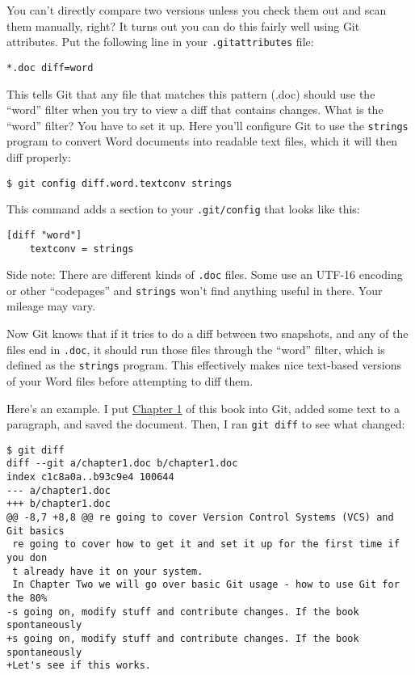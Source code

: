 \documentclass[a4paper]{book}
\newcommand{\prechap}{Chapter }
\newcommand{\postchap}{}
\newcommand{\chapref}[1]{\hyperref[chap:#1]{\prechap #1\postchap}}
\begin{document}
You can't directly compare two versions unless you check them out and scan them manually, right? It turns out you can do this fairly well using Git attributes. Put the following line in your \texttt{.gitattributes} file:

\begin{shaded}\begin{verbatim}
*.doc diff=word
\end{verbatim}\end{shaded}

This tells Git that any file that matches this pattern (.doc) should use the “word” filter when you try to view a diff that contains changes. What is the “word” filter? You have to set it up. Here you'll configure Git to use the \texttt{strings} program to convert Word documents into readable text files, which it will then diff properly:

\begin{shaded}\begin{verbatim}
$ git config diff.word.textconv strings
\end{verbatim}\end{shaded}

This command adds a section to your \texttt{.git/config} that looks like this:

\begin{shaded}\begin{verbatim}
[diff "word"]
	textconv = strings
\end{verbatim}\end{shaded}

Side note: There are different kinds of \texttt{.doc} files. Some use an UTF-16 encoding or other “codepages” and \texttt{strings} won't find anything useful in there. Your mileage may vary.

Now Git knows that if it tries to do a diff between two snapshots, and any of the files end in \texttt{.doc}, it should run those files through the “word” filter, which is defined as the \texttt{strings} program. This effectively makes nice text-based versions of your Word files before attempting to diff them.

Here's an example. I put \chapref{1} of this book into Git, added some text to a paragraph, and saved the document. Then, I ran \texttt{git diff} to see what changed:

\begin{shaded}\begin{verbatim}
$ git diff
diff --git a/chapter1.doc b/chapter1.doc
index c1c8a0a..b93c9e4 100644
--- a/chapter1.doc
+++ b/chapter1.doc
@@ -8,7 +8,8 @@ re going to cover Version Control Systems (VCS) and Git basics
 re going to cover how to get it and set it up for the first time if you don
 t already have it on your system.
 In Chapter Two we will go over basic Git usage - how to use Git for the 80%
-s going on, modify stuff and contribute changes. If the book spontaneously
+s going on, modify stuff and contribute changes. If the book spontaneously
+Let's see if this works.
\end{verbatim}\end{shaded}
\end{document}
